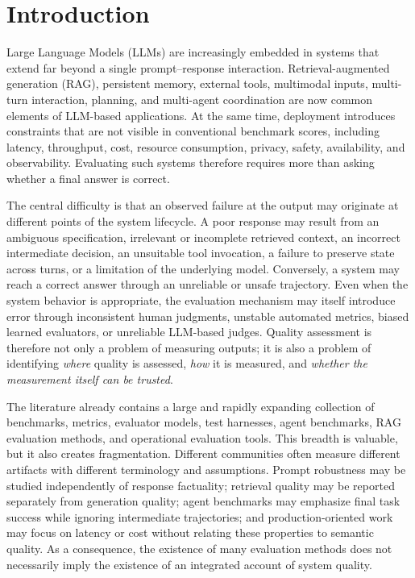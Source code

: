 \section{Introduction}
\label{sec:introduction}

Large Language Models (LLMs) are increasingly embedded in systems that extend far beyond a single prompt--response interaction. Retrieval-augmented generation (RAG), persistent memory, external tools, multimodal inputs, multi-turn interaction, planning, and multi-agent coordination are now common elements of LLM-based applications. At the same time, deployment introduces constraints that are not visible in conventional benchmark scores, including latency, throughput, cost, resource consumption, privacy, safety, availability, and observability. Evaluating such systems therefore requires more than asking whether a final answer is correct.

The central difficulty is that an observed failure at the output may originate at different points of the system lifecycle. A poor response may result from an ambiguous specification, irrelevant or incomplete retrieved context, an incorrect intermediate decision, an unsuitable tool invocation, a failure to preserve state across turns, or a limitation of the underlying model. Conversely, a system may reach a correct answer through an unreliable or unsafe trajectory. Even when the system behavior is appropriate, the evaluation mechanism may itself introduce error through inconsistent human judgments, unstable automated metrics, biased learned evaluators, or unreliable LLM-based judges. Quality assessment is therefore not only a problem of measuring outputs; it is also a problem of identifying \emph{where} quality is assessed, \emph{how} it is measured, and \emph{whether the measurement itself can be trusted}.

The literature already contains a large and rapidly expanding collection of benchmarks, metrics, evaluator models, test harnesses, agent benchmarks, RAG evaluation methods, and operational evaluation tools. This breadth is valuable, but it also creates fragmentation. Different communities often measure different artifacts with different terminology and assumptions. Prompt robustness may be studied independently of response factuality; retrieval quality may be reported separately from generation quality; agent benchmarks may emphasize final task success while ignoring intermediate trajectories; and production-oriented work may focus on latency or cost without relating these properties to semantic quality. As a consequence, the existence of many evaluation methods does not necessarily imply the existence of an integrated account of system quality.

